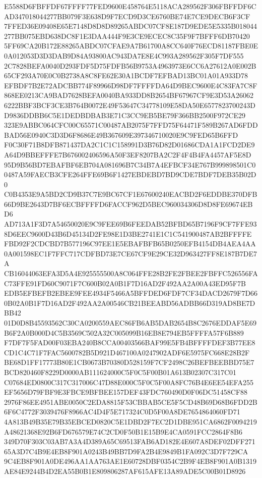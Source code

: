 \documentclass[UTF8,fontset=fandol,zihao=-4,a4paper]{ctexart}
\begin{document}
{{E5588D6FBFFDF67FFFF77FED9600E458764E5118ACA289562F306FBFFDF6CAD347018044277BB079F3E638D9F7ECD9D3CE6760BE74E7CE9DECB6F3CF
7FFED36E09408E65E7148D8D8D89265ABDC07CF8E187D9EDE5E5335B018044277BB075EBD638DC8F1E3DAA444F9E3CE9ECEC8C35F9F7BFFF6DB70420
5FF69CA20B172E88265ABDC07CFAE9A7B61700A8CC640F76ECD81187FBE0E0A012053D3D3DAB9D84A93800AC943DA7E8E4C993A289562F305F7DF555
2C7828BEFA0040D293FDF5D75FDFB56B9753A4963973E6CC6A27612A0E002B65CF293A70E0C0B2738A8C8FE62E30A1BCDF7EFBAD13BC01A01A933D78
EFBDF7B2E72ADCBB774F89966D98DF7FFFFDA64D9BEC9600E4C83FA7C8F868EE0213CA9BAD7628BEFA0040BA933DD8B2654BF67967CF9E3D53A26062
6222BBF3BCF3CE3B764B0072E49F53647C34778109E58DA50E6577823700243DD9836DDBB6C5E1DEDBDBAB3E71C3CC9EB5BE79F366BB2500F972CE29
323E9ABBC064CFC00C65571C00487AB2075F7FFD75F64471F589B267AD6FDDBAD56E0940C3D3D6F8686E49B367609E397346710020E9C9FED65B6FFD
F0C30F71B8DFB871437DA2C1C1C158991D3B76D82D01686CDA1A1FCD2DE9A64D9BBEFFFE7B676002406596A50F3EF8207BA2C2F4F4B4FA4457AF5E8D
95D9B56BD7EBAFBF6EB704A081696B7C34B7A4EFBCF34E767B999898501C00487A59FAECB3CFE264FFE69B6F1427EBDEBD7BD9CDE7BDF7DEB35B02D0
C0B4353E9A5BD2CD9B37C7E9BC67CF1E67600240EACBD2F6EDDBE370DFB66D9BE2643D7BF6ECBFFFFD6FACCF962D5BEC960034306D8D8FE69674EBD6
AD713A1F3D7A54650020E9C9FEE69B6FEEDAB52BFBD65B7196F9CF7FFE938D6EEC9600D43B6D45134D2FE98E1D3BE2741E1C1C541900487AB2BFFFFE
FBD92F2CDCBD7B577196C97EE1E5EBAFBFB65B0250EFB4154DB4AEA4AA0A001598EC1F7FFC717CDFBD73E7CE67CF9E29CE32D963427FF8E187B7DE7A
CB16044063EFA3D5A4E925555500A8C064FFE28B2FE2FBEE2FBFFC526556FAC73FFE91FD60C9071F7C600B02A0B1F7D16AD2F492AA2A00A43ED95F7B
EDB5EFBEFB2EBEE9FEE4934F5466A5BFFDED6FDF7CF34DACD2679F7D660B02A0B1F7D16AD2F492AA2A00546CB21BEEABD56ADBB66D319AD8BE7DBB42
01D0D8B45593562C30CA0200559AEC86FB6AB5DAB2654B8C2676EDDAF5E69B6F2A0B000D4C5B3569C502A32C005099B16EB8E794EB5FFFFA57F6B889
F7DF7F5FAD00F03EBA240B8CCA00403566BAF99E5FB4BFFFFDEF3B77EE8CD1C4C71F7FAC5600782B5D921D467100A0247902ADF6E5975FC668E28B2F
BE68D1FF17773B80E1CB0673B70380D528159F7CF2498C26BEFBEEBBD75E7BCD820460F8229D0000AB111624000C5F0C5F00B01A613B02307C317C01
C07684ED0800C317C317006C47D88E000C5F0C5F00A8FC76B4E6EE54EFA255EF5656D79FBF9E3FBCE9BFBEE157DEF43FDC760490D0F06DC51458CF88
2976F86EE4951ABE0050C2EDA8815F53CBBAB5CE5F5CD48B69D68B6FDD2B6F6C4772F3039476F8966AC4D4F5E717324C0D5F00A8DE7654864060FD71
4A813B49B35E79B35EBCED0820C5E1DBD2F7EC2D1DBE951CA6862F0094219A48621368E92B6FD676579E74C2CD0F50B1E15B9E4CA0591FCC2864F8B6
349D70F303C03AB7A3A4D389A65C69513FAB6AD182E4E607A8DEF02DFF27165A3D7C4B9E4EB8F901A0243B49BB7D9FA2B4E9849B1FA092C3D7F729CA
9C4EB8F901A0DE496AA1AA763AE1E60728DBF0354C2B9F4EB8F901A0B1319AE84E9244B4D2EA55B0B1E809806287AF615AFE13A89ADE5C00B01D8926
}}
\end{document}
